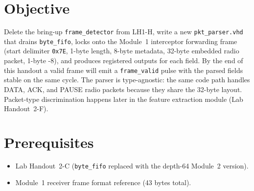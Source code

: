\documentclass[11pt,letterpaper]{article}
\begin{document}

\section{Objective}
Delete the bring-up \texttt{frame\_detector} from LH1-H, write a new \texttt{pkt\_parser.vhd} that drains \texttt{byte\_fifo}, locks onto the Module~1 interceptor forwarding frame (start delimiter \texttt{0x7E}, 1-byte length, 8-byte metadata, 32-byte embedded radio packet, 1-byte \CRC{}-8), and produces registered outputs for each field. By the end of this handout a valid frame will emit a \texttt{frame\_valid} pulse with the parsed fields stable on the same cycle. The parser is type-agnostic: the same code path handles DATA, ACK, and PAUSE radio packets because they share the 32-byte layout. Packet-type discrimination happens later in the feature extraction module (Lab Handout~2-F).

\section{Prerequisites}
\begin{itemize}[leftmargin=2em]
	\item Lab Handout~2-C (\texttt{byte\_fifo} replaced with the depth-64 Module~2 version).
	\item Module~1 receiver frame format reference (43 bytes total).
\end{itemize}
\end{document}
